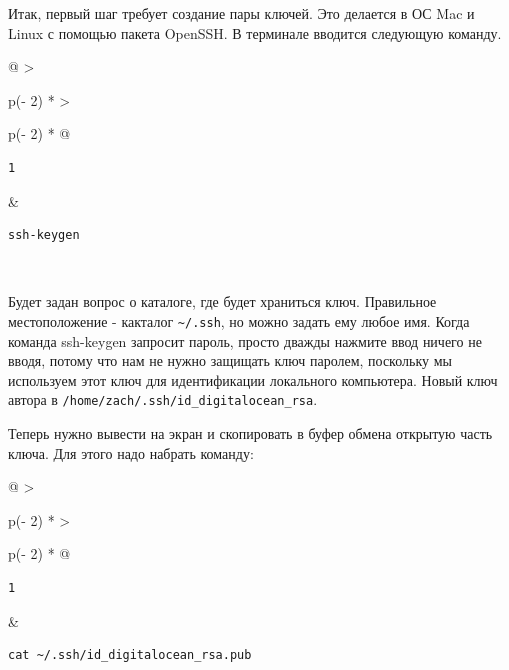 \documentclass{report}
\begin{document}
Итак, первый шаг требует создание пары ключей. Это делается в ОС Mac и
Linux с помощью пакета OpenSSH. В терминале вводится следующую команду.

\begin{longtable}[]{@{}
  >{\raggedright\arraybackslash}p{(\columnwidth - 2\tabcolsep) * }
  >{\raggedright\arraybackslash}p{(\columnwidth - 2\tabcolsep) * }@{}}
\toprule
\endhead
\begin{minipage}[t]{\linewidth}\raggedright
\begin{verbatim}
1
\end{verbatim}
\end{minipage} & \begin{minipage}[t]{\linewidth}\raggedright
\begin{verbatim}
ssh-keygen
\end{verbatim}
\end{minipage} \\ \addlinespace
\bottomrule
\end{longtable}

Будет задан вопрос о каталоге, где будет храниться ключ. Правильное
местоположение - какталог \texttt{\textasciitilde{}/.ssh}, но можно
задать ему любое имя. Когда команда ssh-keygen запросит пароль, просто
дважды нажмите ввод ничего не вводя, потому что нам не нужно защищать
ключ паролем, поскольку мы используем этот ключ для идентификации
локального компьютера. Новый ключ автора в
\texttt{/home/zach/.ssh/id\_digitalocean\_rsa}.

Теперь нужно вывести на экран и скопировать в буфер обмена открытую
часть ключа. Для этого надо набрать команду:

\begin{longtable}[]{@{}
  >{\raggedright\arraybackslash}p{(\columnwidth - 2\tabcolsep) * }
  >{\raggedright\arraybackslash}p{(\columnwidth - 2\tabcolsep) * }@{}}
\toprule
\endhead
\begin{minipage}[t]{\linewidth}\raggedright
\begin{verbatim}
1
\end{verbatim}
\end{minipage} & \begin{minipage}[t]{\linewidth}\raggedright
\begin{verbatim}
cat ~/.ssh/id_digitalocean_rsa.pub
\end{verbatim}
\end{minipage} \\ \addlinespace
\bottomrule
\end{longtable}
\end{document}
